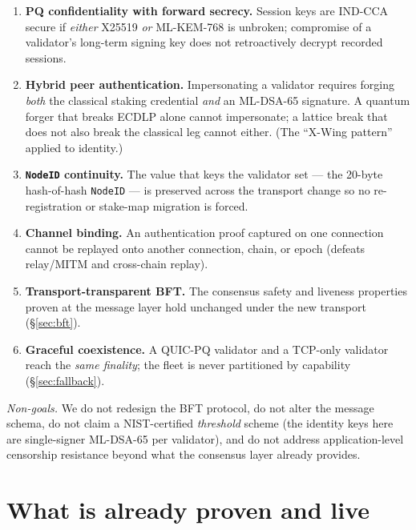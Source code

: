 \documentclass[11pt,a4paper]{article}
\newcommand{\code}[1]{\texttt{#1}}
\begin{document}
\begin{enumerate}[nosep]
  \item[G1] \textbf{PQ confidentiality with forward secrecy.} Session
        keys are IND-CCA secure if \emph{either} X25519 \emph{or}
        ML-KEM-768 is unbroken; compromise of a validator's long-term
        signing key does not retroactively decrypt recorded sessions.
  \item[G2] \textbf{Hybrid peer authentication.} Impersonating a
        validator requires forging \emph{both} the classical staking
        credential \emph{and} an ML-DSA-65 signature. A quantum forger
        that breaks ECDLP alone cannot impersonate; a lattice break that
        does not also break the classical leg cannot either. (The
        ``X-Wing pattern'' applied to identity.)
  \item[G3] \textbf{\code{NodeID} continuity.} The value that keys the
        validator set --- the 20-byte hash-of-hash \code{NodeID} --- is
        preserved across the transport change so no re-registration or
        stake-map migration is forced.
  \item[G4] \textbf{Channel binding.} An authentication proof captured on
        one connection cannot be replayed onto another connection, chain,
        or epoch (defeats relay/MITM and cross-chain replay).
  \item[G5] \textbf{Transport-transparent BFT.} The consensus safety and
        liveness properties proven at the message layer hold unchanged
        under the new transport (\S\ref{sec:bft}).
  \item[G6] \textbf{Graceful coexistence.} A QUIC-PQ validator and a
        TCP-only validator reach the \emph{same finality}; the fleet is
        never partitioned by capability (\S\ref{sec:fallback}).
\end{enumerate}

\emph{Non-goals.} We do not redesign the BFT protocol, do not alter the
message schema, do not claim a NIST-certified \emph{threshold} scheme
(the identity keys here are single-signer ML-DSA-65 per validator), and
do not address application-level censorship resistance beyond what the
consensus layer already provides.

\section{What is already proven and live}\label{sec:proven}
\end{document}
